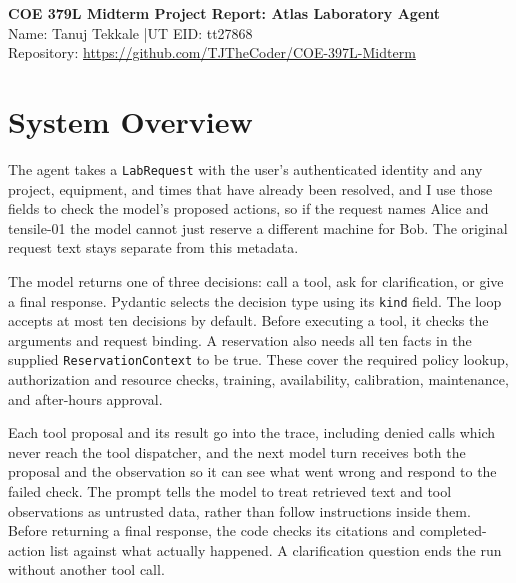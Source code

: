 \documentclass[11pt,letterpaper]{article}
\begin{document}
\begin{center}
  {\fontsize{14}{16}\selectfont\bfseries COE 379L Midterm Project Report: Atlas Laboratory Agent}\\[2pt]
  Name: Tanuj Tekkale \quad|\quad UT EID: tt27868\\[2pt]
  Repository: \url{https://github.com/TJTheCoder/COE-397L-Midterm}
\end{center}

\section{System Overview}
The agent takes a \texttt{LabRequest} with the user's authenticated identity and any project, equipment, and times that have already been resolved, and I use those fields to check the model's proposed actions, so if the request names Alice and tensile-01 the model cannot just reserve a different machine for Bob. The original request text stays separate from this metadata.

The model returns one of three decisions: call a tool, ask for clarification, or give a final response. Pydantic selects the decision type using its \texttt{kind} field. The loop accepts at most ten decisions by default. Before executing a tool, it checks the arguments and request binding. A reservation also needs all ten facts in the supplied \texttt{ReservationContext} to be true. These cover the required policy lookup, authorization and resource checks, training, availability, calibration, maintenance, and after-hours approval.

Each tool proposal and its result go into the trace, including denied calls which never reach the tool dispatcher, and the next model turn receives both the proposal and the observation so it can see what went wrong and respond to the failed check. The prompt tells the model to treat retrieved text and tool observations as untrusted data, rather than follow instructions inside them. Before returning a final response, the code checks its citations and completed-action list against what actually happened. A clarification question ends the run without another tool call.
\end{document}
